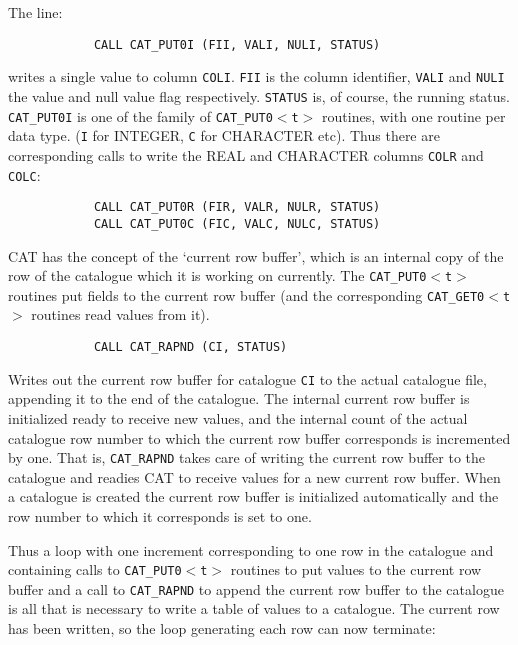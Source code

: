 The line:

\begin{verbatim}
            CALL CAT_PUT0I (FII, VALI, NULI, STATUS)
\end{verbatim}

writes a single value to column {\tt COLI}. {\tt FII} is the column 
identifier, {\tt VALI} and {\tt NULI} the value and null value flag
respectively. {\tt STATUS} is, of course, the running status. {\tt
CAT\_PUT0I} is one of the family of {\tt CAT\_PUT0$<$t$>$} routines, 
with one routine per data type. ({\tt I} for INTEGER, {\tt C} for 
CHARACTER etc). Thus there are corresponding calls to write the REAL and
CHARACTER columns {\tt COLR} and {\tt COLC}:

\begin{verbatim}
            CALL CAT_PUT0R (FIR, VALR, NULR, STATUS)
            CALL CAT_PUT0C (FIC, VALC, NULC, STATUS)
\end{verbatim}

CAT has the concept of the `current row buffer', which is an internal
copy of the row of the catalogue which it is working on currently. The
{\tt CAT\_PUT0$<$t$>$} routines put fields to the current row buffer 
(and the corresponding {\tt CAT\_GET0$<$t$>$} routines read values from 
it).

\begin{verbatim}
            CALL CAT_RAPND (CI, STATUS)
\end{verbatim}

Writes out the current row buffer for catalogue {\tt CI} to the actual
catalogue file, appending it to the end of the catalogue. The internal
current row buffer is initialized ready to receive new values, and the
internal count of the actual catalogue row number to which the current
row buffer corresponds is incremented by one. That is, {\tt CAT\_RAPND}
takes care of writing the current row buffer to the catalogue and
readies CAT to receive values for a new current row buffer. When a
catalogue is created the current row buffer is initialized automatically
and the row number to which it corresponds is set to one.

Thus a loop with one increment corresponding to one row in the 
catalogue and containing calls to {\tt CAT\_PUT0$<$t$>$} routines to put
values to the current row buffer and a call to {\tt CAT\_RAPND} to
append the current row buffer to the catalogue is all that is necessary
to write a table of values to a catalogue. The current row has been 
written, so the loop generating each row can now terminate:

